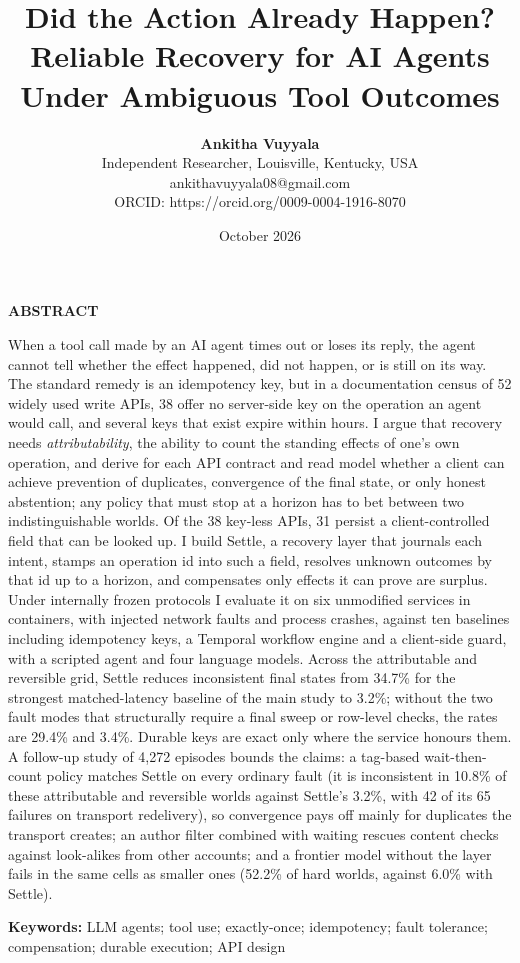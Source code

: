 \documentclass[
  10pt,
]{article}
\title{Did the Action Already Happen? Reliable Recovery for AI Agents
Under Ambiguous Tool Outcomes}
\author{{\fontsize{13}{16}\selectfont\bfseries Ankitha Vuyyala}\\[3pt]{\fontsize{11}{14}\selectfont Independent Researcher, Louisville, Kentucky, USA}\\{\fontsize{11}{14}\selectfont ankithavuyyala08@gmail.com}\\{\fontsize{11}{14}\selectfont ORCID: https://orcid.org/0009-0004-1916-8070}}
\date{October 2026}
\renewenvironment{abstract}{\begin{tcolorbox}[enhanced,colback=cvfill,colframe=cvbox,boxrule=0.5pt,arc=0pt,
  left=6pt,right=6pt,top=5pt,bottom=5pt,fontupper=\fontsize{10.5}{12}\selectfont]%
  {\bfseries\color{cvdeep}ABSTRACT}\par\vspace{2pt}}{\end{tcolorbox}}
\begin{document}
\maketitle
\begin{abstract}
When a tool call made by an AI agent times out or loses its reply, the
agent cannot tell whether the effect happened, did not happen, or is
still on its way. The standard remedy is an idempotency key, but in a
documentation census of 52 widely used write APIs, 38 offer no
server-side key on the operation an agent would call, and several keys
that exist expire within hours. I argue that recovery needs
\emph{attributability}, the ability to count the standing effects of
one's own operation, and derive for each API contract and read model
whether a client can achieve prevention of duplicates, convergence of
the final state, or only honest abstention; any policy that must stop at
a horizon has to bet between two indistinguishable worlds. Of the 38
key-less APIs, 31 persist a client-controlled field that can be looked
up. I build Settle, a recovery layer that journals each intent, stamps
an operation id into such a field, resolves unknown outcomes by that id
up to a horizon, and compensates only effects it can prove are surplus.
Under internally frozen protocols I evaluate it on six unmodified
services in containers, with injected network faults and process
crashes, against ten baselines including idempotency keys, a Temporal
workflow engine and a client-side guard, with a scripted agent and four
language models. Across the attributable and reversible grid, Settle
reduces inconsistent final states from 34.7\% for the strongest
matched-latency baseline of the main study to 3.2\%; without the two
fault modes that structurally require a final sweep or row-level checks,
the rates are 29.4\% and 3.4\%. Durable keys are exact only where the
service honours them. A follow-up study of 4,272 episodes bounds the
claims: a tag-based wait-then-count policy matches Settle on every
ordinary fault (it is inconsistent in 10.8\% of these attributable and
reversible worlds against Settle's 3.2\%, with 42 of its 65 failures on
transport redelivery), so convergence pays off mainly for duplicates the
transport creates; an author filter combined with waiting rescues
content checks against look-alikes from other accounts; and a frontier
model without the layer fails in the same cells as smaller ones (52.2\%
of hard worlds, against 6.0\% with Settle).
\end{abstract}

\textbf{Keywords:} LLM agents; tool use; exactly-once; idempotency;
fault tolerance; compensation; durable execution; API design
\end{document}
